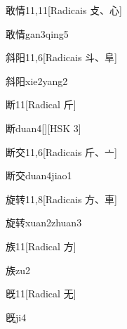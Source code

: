 \begin{entry}{敢情}{11,11}[Radicais ⽁、⼼]
  \begin{phonetics}{敢情}{gan3qing5}
  \end{phonetics}
\end{entry}

\begin{entry}{斜阳}{11,6}[Radicais ⽃、⾩]
  \begin{phonetics}{斜阳}{xie2yang2}
  \end{phonetics}
\end{entry}

\begin{entry}{断}{11}[Radical ⽄]
  \begin{phonetics}{断}{duan4}[][HSK 3]
  \end{phonetics}
\end{entry}

\begin{entry}{断交}{11,6}[Radicais ⽄、⼇]
  \begin{phonetics}{断交}{duan4jiao1}
  \end{phonetics}
\end{entry}

\begin{entry}{旋转}{11,8}[Radicais ⽅、⾞]
  \begin{phonetics}{旋转}{xuan2zhuan3}
  \end{phonetics}
\end{entry}

\begin{entry}{族}{11}[Radical ⽅]
  \begin{phonetics}{族}{zu2}
  \end{phonetics}
\end{entry}

\begin{entry}{旣}{11}[Radical ⽆]
  \begin{phonetics}{旣}{ji4}
  \end{phonetics}
\end{entry}

